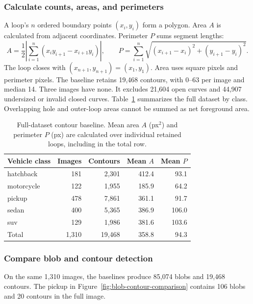 \subsubsection{Calculate counts, areas, and perimeters}
A loop's $n$ ordered boundary points $(x_i,y_i)$ form a polygon. Area $A$
is calculated from adjacent coordinates. Perimeter $P$ sums segment lengths:
\begin{equation}
 A=\frac12\left|\sum_{i=1}^{n}(x_i y_{i+1}-x_{i+1}y_i)\right|,
 \qquad
 P=\sum_{i=1}^{n}\sqrt{(x_{i+1}-x_i)^2+(y_{i+1}-y_i)^2}.
 \label{eq:contour-geometry}
\end{equation}
The loop closes with $(x_{n+1},y_{n+1})=(x_1,y_1)$. Area uses square pixels
and perimeter pixels. The baseline retains 19,468 contours, with 0--63 per
image and median 14. Three images have none. It excludes 21,604 open curves
and 44,907 undersized or invalid closed curves.
Table~\ref{tab:detection-image-stats} summarizes the full dataset by class.
Overlapping hole and outer-loop areas cannot be summed as net foreground area.

\begin{table}[H]
\centering
\small
\caption{Full-dataset contour baseline. Mean area $A$ (px$^2$) and perimeter
$P$ (px) are calculated over individual retained loops, including in the total row.}
\label{tab:detection-image-stats}
\begin{tabular}{lrrrr}
\toprule
Vehicle class & Images & Contours & Mean $A$ & Mean $P$ \\
\midrule
hatchback & 181 & 2,301 & 412.4 & 93.1 \\
motorcycle & 122 & 1,955 & 185.9 & 64.2 \\
pickup & 478 & 7,861 & 361.1 & 91.7 \\
sedan & 400 & 5,365 & 386.9 & 106.0 \\
suv & 129 & 1,986 & 381.6 & 103.6 \\
\midrule
Total & 1,310 & 19,468 & 358.8 & 94.3 \\
\bottomrule
\end{tabular}
\end{table}

\subsubsection{Compare blob and contour detection}
On the same 1,310 images, the baselines produce 85,074 blobs and 19,468 contours.
The pickup in Figure~\ref{fig:blob-contour-comparison} contains 106 blobs and
20 contours in the full image.

